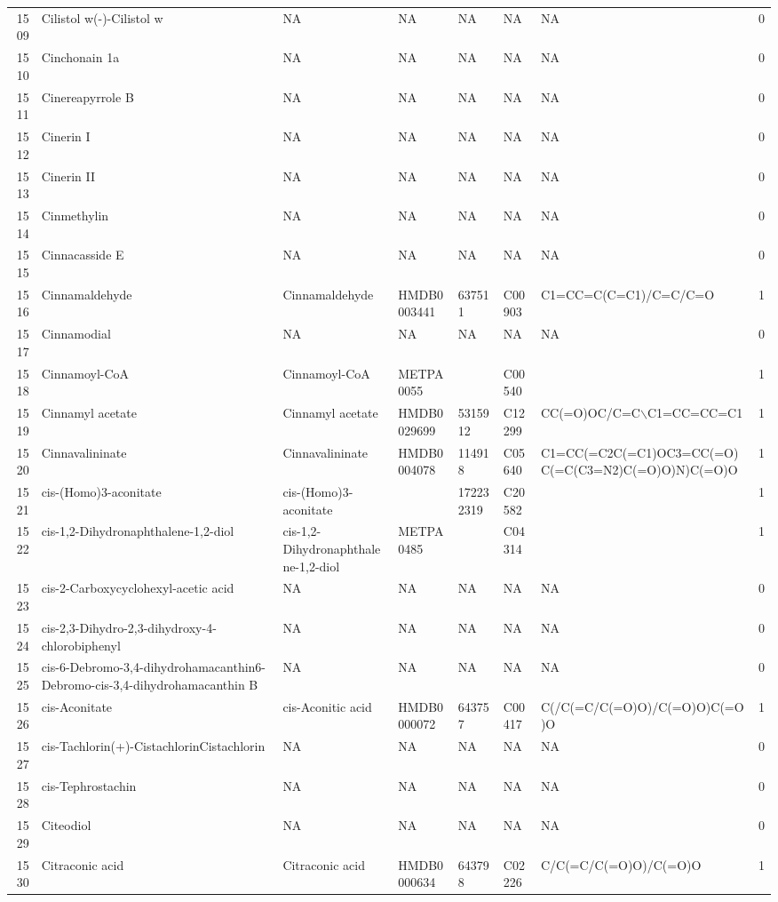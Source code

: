 \documentclass[a4paper]{article}
\begin{document}
\begin{longtable}{rlllllll}
  1509 & Cilistol w(-)-Cilistol w & NA & NA & NA & NA & NA & 0 \\ 
  1510 & Cinchonain 1a & NA & NA & NA & NA & NA & 0 \\ 
  1511 & Cinereapyrrole B & NA & NA & NA & NA & NA & 0 \\ 
  1512 & Cinerin I & NA & NA & NA & NA & NA & 0 \\ 
  1513 & Cinerin II & NA & NA & NA & NA & NA & 0 \\ 
  1514 & Cinmethylin & NA & NA & NA & NA & NA & 0 \\ 
  1515 & Cinnacasside E & NA & NA & NA & NA & NA & 0 \\ 
  1516 & Cinnamaldehyde & Cinnamaldehyde & HMDB0003441 & 637511 & C00903 & C1=CC=C(C=C1)/C=C/C=O & 1 \\ 
  1517 & Cinnamodial & NA & NA & NA & NA & NA & 0 \\ 
  1518 & Cinnamoyl-CoA & Cinnamoyl-CoA & METPA0055 &  & C00540 &  & 1 \\ 
  1519 & Cinnamyl acetate & Cinnamyl acetate & HMDB0029699 & 5315912 & C12299 & CC(=O)OC/C=C$\backslash$C1=CC=CC=C1 & 1 \\ 
  1520 & Cinnavalininate & Cinnavalininate & HMDB0004078 & 114918 & C05640 & C1=CC(=C2C(=C1)OC3=CC(=O)C(=C(C3=N2)C(=O)O)N)C(=O)O & 1 \\ 
  1521 & cis-(Homo)3-aconitate & cis-(Homo)3-aconitate &  & 172232319 & C20582 &  & 1 \\ 
  1522 & cis-1,2-Dihydronaphthalene-1,2-diol & cis-1,2-Dihydronaphthalene-1,2-diol & METPA0485 &  & C04314 &  & 1 \\ 
  1523 & cis-2-Carboxycyclohexyl-acetic acid & NA & NA & NA & NA & NA & 0 \\ 
  1524 & cis-2,3-Dihydro-2,3-dihydroxy-4-chlorobiphenyl & NA & NA & NA & NA & NA & 0 \\ 
  1525 & cis-6-Debromo-3,4-dihydrohamacanthin6-Debromo-cis-3,4-dihydrohamacanthin B & NA & NA & NA & NA & NA & 0 \\ 
  1526 & cis-Aconitate & cis-Aconitic acid & HMDB0000072 & 643757 & C00417 & C(/C(=C/C(=O)O)/C(=O)O)C(=O)O & 1 \\ 
  1527 & cis-Tachlorin(+)-CistachlorinCistachlorin & NA & NA & NA & NA & NA & 0 \\ 
  1528 & cis-Tephrostachin & NA & NA & NA & NA & NA & 0 \\ 
  1529 & Citeodiol & NA & NA & NA & NA & NA & 0 \\ 
  1530 & Citraconic acid & Citraconic acid & HMDB0000634 & 643798 & C02226 & C/C(=C/C(=O)O)/C(=O)O & 1 \\ 

\end{longtable}
\end{document}
